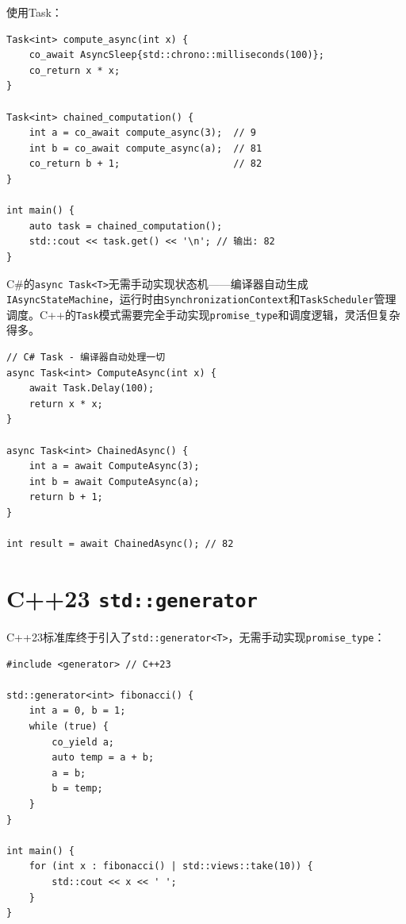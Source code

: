 \documentclass[12pt,a4paper,fontset=fandol]{ctexbook}
\newcommand{\cpp}[1]{C++#1}
\newcommand{\csharp}{C\#}
\begin{document}
使用Task：

\begin{lstlisting}
Task<int> compute_async(int x) {
    co_await AsyncSleep{std::chrono::milliseconds(100)};
    co_return x * x;
}

Task<int> chained_computation() {
    int a = co_await compute_async(3);  // 9
    int b = co_await compute_async(a);  // 81
    co_return b + 1;                    // 82
}

int main() {
    auto task = chained_computation();
    std::cout << task.get() << '\n'; // 输出: 82
}
\end{lstlisting}

\begin{compare}
\csharp{}的\texttt{async Task<T>}无需手动实现状态机——编译器自动生成\texttt{IAsync\allowbreak{}State\allowbreak{}Machine}，运行时由\texttt{Synchronization\allowbreak{}Context}和\texttt{Task\allowbreak{}Scheduler}管理调度。\cpp{}的\texttt{Task}模式需要完全手动实现\texttt{promise\_\allowbreak{}type}和调度逻辑，灵活但复杂得多。

\begin{lstlisting}[style=csharpstyle]
// C# Task - 编译器自动处理一切
async Task<int> ComputeAsync(int x) {
    await Task.Delay(100);
    return x * x;
}

async Task<int> ChainedAsync() {
    int a = await ComputeAsync(3);
    int b = await ComputeAsync(a);
    return b + 1;
}

int result = await ChainedAsync(); // 82
\end{lstlisting}
\end{compare}

\section{\cpp{}23 \texttt{std::generator}}

\cpp{}23标准库终于引入了\texttt{std::generator<T>}，无需手动实现\texttt{promise\_type}：

\begin{lstlisting}
#include <generator> // C++23

std::generator<int> fibonacci() {
    int a = 0, b = 1;
    while (true) {
        co_yield a;
        auto temp = a + b;
        a = b;
        b = temp;
    }
}

int main() {
    for (int x : fibonacci() | std::views::take(10)) {
        std::cout << x << ' ';
    }
}
\end{lstlisting}
\end{document}
